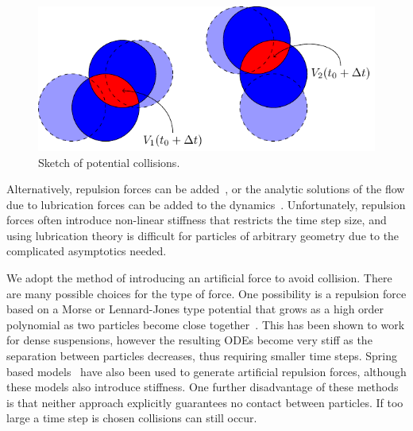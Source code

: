 \documentclass[preprint, 10pt]{elsarticle}
\begin{document}
\begin{figure}[!h]\label{fig:collision_sketch}
\begin{center}
\includegraphics{figures/collisions.pdf}
\end{center}
\caption{Sketch of potential collisions.}
\end{figure}

 Alternatively, repulsion forces can be added~\cite{Malhotra2018}, or
the analytic solutions of the flow due to lubrication forces can be
added to the dynamics~\cite{Mammoli2006}.  Unfortunately, repulsion
forces often introduce non-linear stiffness that restricts the time step
size, and using lubrication theory is difficult for particles of arbitrary
geometry due to the complicated asymptotics needed.

We adopt the method of introducing an artificial force to avoid
collision. There are many possible choices for the type of force. One
possibility is a repulsion force based on a Morse or Lennard-Jones type
potential that grows as a high order polynomial as two particles become
close together~\cite{Flormann2017, Liu2006}. This has been shown to work
for dense suspensions, however the resulting ODEs become very stiff as
the separation between particles decreases, thus requiring smaller time
steps. Spring based models~\cite{Tsubota2006, Zhao2013, Kabacogulu2017}
have also been used to generate artificial repulsion forces, although
these models also introduce stiffness. One further disadvantage of these
methods is that neither approach explicitly guarantees no contact
between particles. If too large a time step is chosen collisions can
still occur. 
\end{document}
